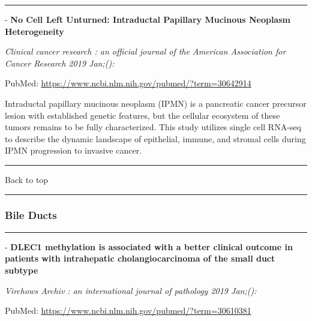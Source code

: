 \documentclass[]{article}
\begin{document}
{}

{}

\begin{center}\rule{0.5\linewidth}{\linethickness}\end{center}

 - \textbf{No Cell Left Unturned: Intraductal Papillary Mucinous
Neoplasm Heterogeneity}

\emph{Clinical cancer research : an official journal of the American
Association for Cancer Research 2019 Jan;():}

PubMed: \url{https://www.ncbi.nlm.nih.gov/pubmed/?term=30642914}

Intraductal papillary mucinous neoplasm (IPMN) is a pancreatic cancer
precursor lesion with established genetic features, but the cellular
ecosystem of these tumors remains to be fully characterized. This study
utilizes single cell RNA-seq to describe the dynamic landscape of
epithelial, immune, and stromal cells during IPMN progression to
invasive cancer.

{}

{}

\begin{center}\rule{0.5\linewidth}{\linethickness}\end{center}

Back to top

\begin{center}\rule{0.5\linewidth}{\linethickness}\end{center}

\pagebreak

\hypertarget{bile-ducts-2}{%
\subsubsection{Bile Ducts}\label{bile-ducts-2}}

\begin{center}\rule{0.5\linewidth}{\linethickness}\end{center}

 - \textbf{DLEC1 methylation is associated with a better clinical
outcome in patients with intrahepatic cholangiocarcinoma of the small
duct subtype}

\emph{Virchows Archiv : an international journal of pathology 2019
Jan;():}

PubMed: \url{https://www.ncbi.nlm.nih.gov/pubmed/?term=30610381}
\end{document}
